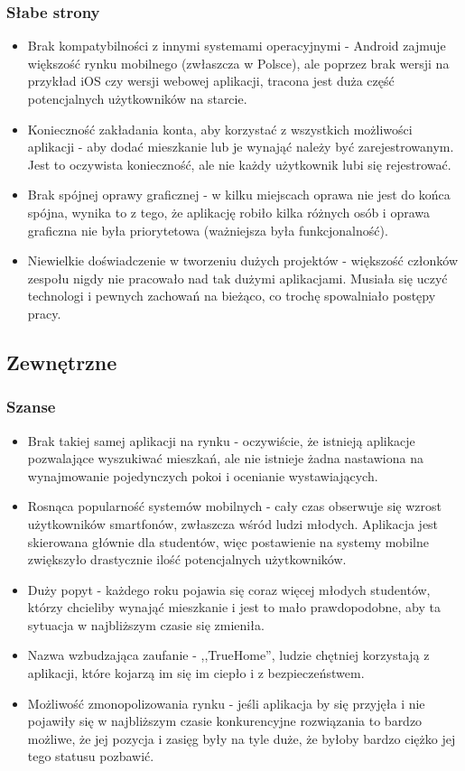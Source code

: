 \documentclass[polish, 11pt]{article}
\begin{document}
        \subsubsection{Słabe strony}
            \begin{itemize}
                \item Brak kompatybilności z innymi systemami operacyjnymi - Android zajmuje większość rynku mobilnego (zwłaszcza w Polsce), ale poprzez brak wersji na przykład iOS czy wersji webowej aplikacji, tracona jest duża część potencjalnych użytkowników na starcie.
                \item Konieczność zakładania konta, aby korzystać z wszystkich możliwości aplikacji - aby dodać mieszkanie lub je wynająć należy być zarejestrowanym. Jest to oczywista konieczność, ale nie każdy użytkownik lubi się rejestrować.
                \item Brak spójnej oprawy graficznej - w kilku miejscach oprawa nie jest do końca spójna, wynika to z tego, że aplikację robiło kilka różnych osób i oprawa graficzna nie była priorytetowa (ważniejsza była funkcjonalność).
                \item Niewielkie doświadczenie w tworzeniu dużych projektów - większość członków zespołu nigdy nie pracowało nad tak dużymi aplikacjami. Musiała się uczyć technologi i pewnych zachowań na bieżąco, co trochę spowalniało postępy pracy.
            \end{itemize}
    \subsection{Zewnętrzne}
        \subsubsection{Szanse}
            \begin{itemize}
                \item Brak takiej samej aplikacji na rynku - oczywiście, że istnieją aplikacje pozwalające wyszukiwać mieszkań, ale nie istnieje żadna nastawiona na wynajmowanie pojedynczych pokoi i ocenianie wystawiających.
                \item Rosnąca popularność systemów mobilnych - cały czas obserwuje się wzrost użytkowników smartfonów, zwłaszcza wśród ludzi młodych. Aplikacja jest skierowana głównie dla studentów, więc postawienie na systemy mobilne zwiększyło drastycznie ilość potencjalnych użytkowników.
                \item Duży popyt - każdego roku pojawia się coraz więcej młodych studentów, którzy chcieliby wynająć mieszkanie i jest to mało prawdopodobne, aby ta sytuacja w najbliższym czasie się zmieniła. 
                \item Nazwa wzbudzająca zaufanie - ,,TrueHome'', ludzie chętniej korzystają z aplikacji, które kojarzą im się im ciepło i z bezpieczeństwem.
                \item Możliwość zmonopolizowania rynku - jeśli aplikacja by się przyjęła i nie pojawiły się w najbliższym czasie konkurencyjne rozwiązania to bardzo możliwe, że jej pozycja i zasięg były na tyle duże, że byłoby bardzo ciężko jej tego statusu pozbawić.
            \end{itemize}
\end{document}
